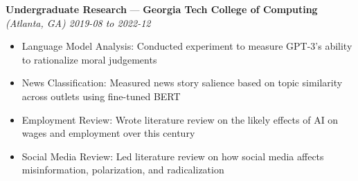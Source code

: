 \documentclass[10pt]{article}
\newcommand{\resumeSubHeading}[5]{
    \vspace*{5pt}
    \textbf{#1} — \textbf{#2} \textsl{(#3) \hfill #4 to #5}
}
\begin{document}
\resumeSubHeading
    {Undergraduate Research}
    {Georgia Tech College of Computing}
    {Atlanta, GA}
    {2019-08}
    {2022-12}
\begin{itemize}
    \item Language Model Analysis:
        Conducted experiment to measure GPT-3's ability to rationalize moral judgements
    \item News Classification:
        Measured news story salience based on topic similarity across outlets using fine-tuned BERT
    \item Employment Review:
        Wrote literature review on the likely effects of AI on wages and employment over this century
    \item Social Media Review:
        Led literature review on how social media affects misinformation, polarization, and radicalization
\end{itemize}
\end{document}
